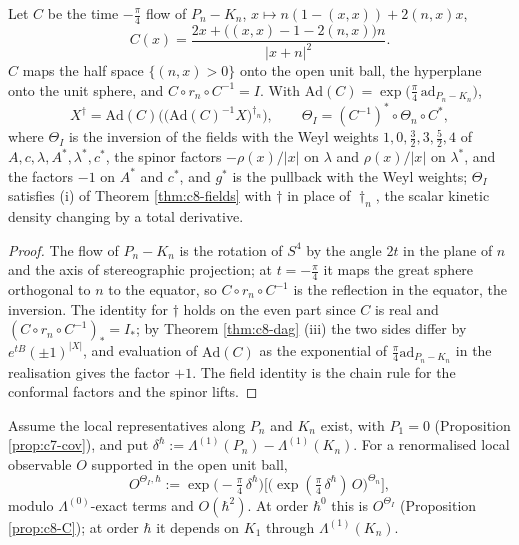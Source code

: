 \begin{proposition}
\label{prop:c8-C}
Let $C$ be the time $-\tfrac\pi4$ flow of $P_n-K_n$, $x\mapsto n(1-(x,x))+2(n,x)x$,
\[
C(x)=\frac{2x+\big((x,x)-1-2(n,x)\big)n}{|x+n|^2}.
\]
$C$ maps the half space $\{(n,x)>0\}$ onto the open unit ball, the hyperplane onto the unit sphere, and $C\circ r_n\circ C^{-1}=I$. With $\mathrm{Ad}(C)=\exp\big(\tfrac\pi4\,\mathrm{ad}_{P_n-K_n}\big)$,
\[
X^\dagger=\mathrm{Ad}(C)\Big(\big(\mathrm{Ad}(C)^{-1}X\big)^{\dagger_n}\Big),\qquad \Theta_I=(C^{-1})^*\circ\Theta_n\circ C^*,
\]
where $\Theta_I$ is the inversion of the fields with the Weyl weights $1,0,\tfrac32,3,\tfrac52,4$ of $A,c,\lambda,A^*,\lambda^*,c^*$, the spinor factors $-\rho(x)/|x|$ on $\lambda$ and $\rho(x)/|x|$ on $\lambda^*$, and the factors $-1$ on $A^*$ and $c^*$, and $g^*$ is the pullback with the Weyl weights; $\Theta_I$ satisfies (i) of Theorem \ref{thm:c8-fields} with $\dagger$ in place of $\dagger_n$, the scalar kinetic density changing by a total derivative.
\end{proposition}

\begin{proof}
The flow of $P_n-K_n$ is the rotation of $S^4$ by the angle $2t$ in the plane of $n$ and the axis of stereographic projection; at $t=-\tfrac\pi4$ it maps the great sphere orthogonal to $n$ to the equator, so $C\circ r_n\circ C^{-1}$ is the reflection in the equator, the inversion. The identity for $\dagger$ holds on the even part since $C$ is real and $(C\circ r_n\circ C^{-1})_*=I_*$; by Theorem \ref{thm:c8-dag} (iii) the two sides differ by $e^{tB}(\pm1)^{|X|}$, and evaluation of $\mathrm{Ad}(C)$ as the exponential of $\tfrac\pi4\mathrm{ad}_{P_n-K_n}$ in the realisation gives the factor $+1$. The field identity is the chain rule for the conformal factors and the spinor lifts.
\end{proof}

\begin{definition}
\label{def:c8-radial}
Assume the local representatives along $P_n$ and $K_n$ exist, with $P_1=0$ (Proposition \ref{prop:c7-cov}), and put $\delta^\hbar:=\Lambda^{(1)}(P_n)-\Lambda^{(1)}(K_n)$. For a renormalised local observable $O$ supported in the open unit ball,
\[
O^{\Theta_I,\hbar}:=\exp\big(-\tfrac\pi4\,\delta^\hbar\big)\Big[\big(\exp(\tfrac\pi4\,\delta^\hbar)\,O\big)^{\Theta_n}\Big],
\]
modulo $\Lambda^{(0)}$-exact terms and $O(\hbar^2)$. At order $\hbar^0$ this is $O^{\Theta_I}$ (Proposition \ref{prop:c8-C}); at order $\hbar$ it depends on $K_1$ through $\Lambda^{(1)}(K_n)$.
\end{definition}

